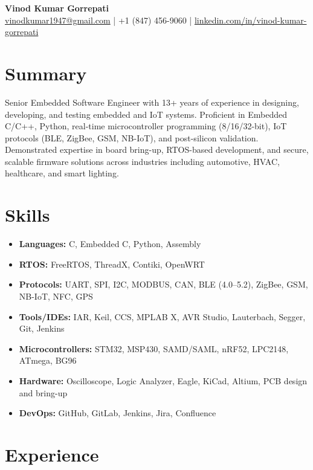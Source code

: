 \documentclass[10pt]{article}
\begin{document}
\begin{center}
    {\Huge \textbf{Vinod Kumar Gorrepati}} \\[4pt]
    \href{mailto:vinodkumar1947@gmail.com}{vinodkumar1947@gmail.com} \quad | \quad +1 (847) 456-9060 \quad | \quad \href{https://www.linkedin.com/in/vinod-kumar-gorrepati}{linkedin.com/in/vinod-kumar-gorrepati}
\end{center}

\vspace{1em}

\section*{Summary}
Senior Embedded Software Engineer with 13+ years of experience in designing, developing, and testing embedded and IoT systems. Proficient in Embedded C/C++, Python, real-time microcontroller programming (8/16/32-bit), IoT protocols (BLE, ZigBee, GSM, NB-IoT), and post-silicon validation. Demonstrated expertise in board bring-up, RTOS-based development, and secure, scalable firmware solutions across industries including automotive, HVAC, healthcare, and smart lighting.

\section*{Skills}
\begin{itemize}[leftmargin=*]
  \item \textbf{Languages:} C, Embedded C, Python, Assembly
  \item \textbf{RTOS:} FreeRTOS, ThreadX, Contiki, OpenWRT
  \item \textbf{Protocols:} UART, SPI, I2C, MODBUS, CAN, BLE (4.0–5.2), ZigBee, GSM, NB-IoT, NFC, GPS
  \item \textbf{Tools/IDEs:} IAR, Keil, CCS, MPLAB X, AVR Studio, Lauterbach, Segger, Git, Jenkins
  \item \textbf{Microcontrollers:} STM32, MSP430, SAMD/SAML, nRF52, LPC2148, ATmega, BG96
  \item \textbf{Hardware:} Oscilloscope, Logic Analyzer, Eagle, KiCad, Altium, PCB design and bring-up
  \item \textbf{DevOps:} GitHub, GitLab, Jenkins, Jira, Confluence
\end{itemize}

\section*{Experience}
\end{document}

